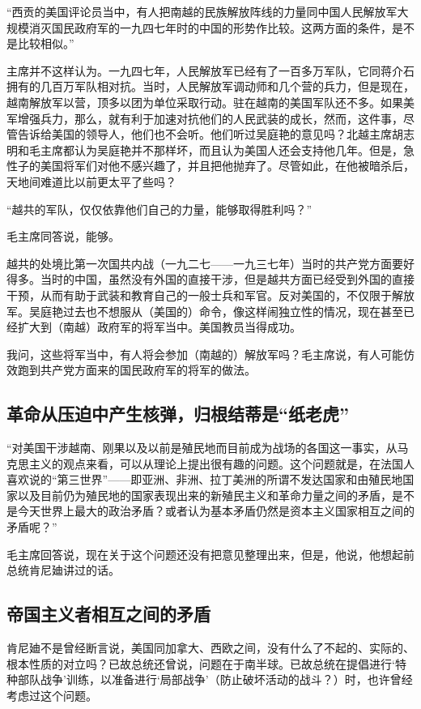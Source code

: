 “西贡的美国评论员当中，有人把南越的民族解放阵线的力量同中国人民解放军大规模消灭国民政府军的一九四七年时的中国的形势作比较。这两方面的条件，是不是比较相似。”

主席并不这样认为。一九四七年，人民解放军已经有了一百多万军队，它同蒋介石拥有的几百万军队相对抗。当时，人民解放军调动师和几个营的兵力，但是现在，越南解放军以营，顶多以团为单位采取行动。驻在越南的美国军队还不多。如果美军增强兵力，那么，就有利于加速对抗他们的人民武装的成长，然而，这件事，尽管告诉给美国的领导人，他们也不会听。他们听过吴庭艳的意见吗？北越主席胡志明和毛主席都认为吴庭艳并不那样坏，而且认为美国人还会支持他几年。但是，急性子的美国将军们对他不感兴趣了，并且把他抛弃了。尽管如此，在他被暗杀后，天地间难道比以前更太平了些吗？

“越共的军队，仅仅依靠他们自己的力量，能够取得胜利吗？”

毛主席同答说，能够。

越共的处境比第一次国共内战（一九二七——一九三七年）当时的共产党方面要好得多。当时的中国，虽然没有外国的直接干涉，但是越共方面已经受到外国的直接干预，从而有助于武装和教育自己的一般士兵和军官。反对美国的，不仅限于解放军。吴庭艳过去也不想服从（美国的）命令，像这样闹独立性的情况，现在甚至已经扩大到（南越）政府军的将军当中。美国教员当得成功。

我问，这些将军当中，有人将会参加（南越的）解放军吗？毛主席说，有人可能仿效跑到共产党方面来的国民政府军的将军的做法。

\subsection{革命从压迫中产生核弹，归根结蒂是“纸老虎”}

“对美国干涉越南、刚果以及以前是殖民地而目前成为战场的各国这一事实，从马克思主义的观点来看，可以从理论上提出很有趣的问题。这个问题就是，在法国人喜欢说的“第三世界”——即亚洲、非洲、拉丁美洲的所谓不发达国家和由殖民地国家以及目前仍为殖民地的国家表现出来的新殖民主义和革命力量之间的矛盾，是不是今天世界上最大的政治矛盾？或者认为基本矛盾仍然是资本主义国家相互之间的矛盾呢？”

毛主席回答说，现在关于这个问题还没有把意见整理出来，但是，他说，他想起前总统肯尼廸讲过的话。

\subsection{帝国主义者相互之间的矛盾}

肯尼廸不是曾经断言说，美国同加拿大、西欧之间，没有什么了不起的、实际的、根本性质的对立吗？已故总统还曾说，问题在于南半球。已故总统在提倡进行‘特种部队战争’训练，以准备进行‘局部战争’（防止破坏活动的战斗？）时，也许曾经考虑过这个问题。

